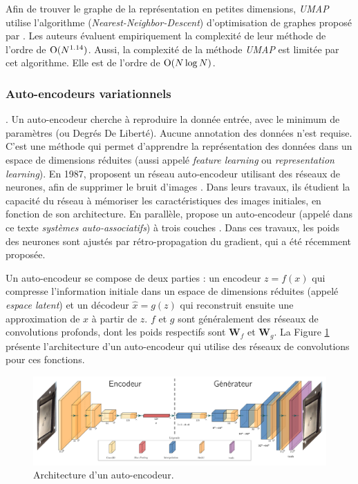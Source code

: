 Afin de trouver le graphe de la représentation en petites dimensions, \textit{UMAP} utilise l'algorithme (\textit{Nearest-Neighbor-Descent}) d'optimisation de graphes proposé par \citeauthor{dong_efficient_2011} \cite{dong_efficient_2011}.
Les auteurs évaluent empiriquement la complexité de leur méthode de l'ordre de $\operatorname{O}(N^{1.14})$.
Aussi, la complexité de la méthode \textit{UMAP} est limitée par cet algorithme.
Elle est de l'ordre de $\operatorname{O}(N \log N)$.


\subsubsection{Auto-encodeurs variationnels} \label{subsubsec:vae}.
Un auto-encodeur cherche à reproduire la donnée entrée, avec le minimum de paramètres (ou Degrés De Liberté).
Aucune annotation des données n'est requise.
C'est une méthode qui permet d'apprendre la représentation des données dans un espace de dimensions réduites (aussi appelé \textit{feature learning} ou \textit{representation learning}).
En 1987, \citeauthor{lecun_modeles_1987, gallinari_memoires_1987} proposent un réseau auto-encodeur utilisant des réseaux de neurones, afin de supprimer le bruit d'images \cite{lecun_modeles_1987, gallinari_memoires_1987}.
Dans leurs travaux, ils étudient la capacité du réseau à mémoriser les caractéristiques des images initiales, en fonction de son architecture.
En parallèle, \citeauthor{ballard_modular_1987} propose un auto-encodeur (appelé dans ce texte \textit{systèmes auto-associatifs}) à trois couches \cite{ballard_modular_1987}.
Dans ces travaux, les poids des neurones sont ajustés par rétro-propagation du gradient, qui a été récemment proposée.

Un auto-encodeur se compose de deux parties : un encodeur $z = f(x)$ qui compresse l'information initiale dans un espace de dimensions réduites (appelé \textit{espace latent}) et un décodeur $\hat x = g(z)$ qui reconstruit ensuite une approximation de $x$ à partir de $z$.
$f$ et $g$ sont généralement des réseaux de convolutions profonds, dont les poids respectifs sont $\mathbf{W}_f$ et $\mathbf{W}_g$.
La Figure \ref{fig:autoencoder_architecture} présente l'architecture d'un auto-encodeur qui utilise des réseaux de convolutions pour ces fonctions.

\begin{figure}[hbtp]
    \centering
    \includegraphics[width=\textwidth,height=\textheight,keepaspectratio]{../Chap4/Figures/autoencoder_architecture.pdf}
    \caption{Architecture d'un auto-encodeur.}
    \label{fig:autoencoder_architecture}
\end{figure}

